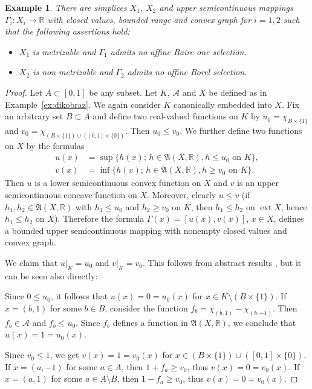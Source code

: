 \documentclass{amsart}
\numberwithin{equation}{section}
\newtheorem{example}[thm]{Example}
\theoremstyle{definition}
\def\fra{\mathfrak{A}}
\def\A{\mathcal A}
\def\er{\mathbb R}
\def\r{|}
\def \ext {\operatorname{ext}}
\newcommand{\setsep}{;\,}
\begin{document}
\begin{example}\label{ex:selekce}
There are simplices $X_1$, $X_2$ and upper semicontinuous mappings $\Gamma_i\colon X_i\to\er$ with closed values, bounded range and convex graph for $i=1,2$ such that the following assertions hold:
\begin{itemize}
	\item[(i)] $X_1$ is metrizable and $\Gamma_1$ admits no affine Baire-one selection.
	\item[(ii)] $X_2$ is non-metrizable and $\Gamma_2$ admits no affine Borel selection.
\end{itemize}
\end{example}

\begin{proof} Let $A\subset [0,1]$ be any subset. Let $K$, $\A$ and $X$ be defined as in Example~\ref{ex:dikobraz}.
We again consider $K$ canonically embedded into $X$. Fix an arbitrary set $B\subset A$ and define two real-valued functions on $K$ by
$u_0=\chi_{B\times\{1\}}$ and $v_0=\chi_{(B\times\{1\})\cup ([0,1]\times\{0\})}$. Then $u_0\le v_0$. We further define two functions on $X$ by the formulas
$$\begin{aligned}
u(x)&=\sup\{ h(x)\setsep h\in\fra(X,\er), h\le u_0\mbox{ on }K\}, \\
v(x)&=\inf\{ h(x)\setsep h\in\fra(X,\er), h\ge v_0\mbox{ on }K\}.
\end{aligned}$$
Then $u$ is a lower semicontinuous convex function on $X$ and $v$ is an upper semicontinuous concave function on $X$. Moreover,
clearly $u\le v$ (if $h_1,h_2\in\fra(X,\er)$ with $h_1\le u_0$ and $h_2\ge v_0$ on $K$, then $h_1\le h_2$ on $\ext X$, hence $h_1\le h_2$ on $X$). Therefore the formula $\Gamma(x)=[u(x),v(x)]$, $x\in X$, defines a bounded upper semicontinuous mapping with nonempty closed values and convex graph.

We claim that $u\r_K=u_0$ and $v\r_K=v_0$. This follows from abstract results \cite[Propositions 3.48 and 3.55]{lmns}, but it can be seen also directly:

Since $0\le u_0$, it follows that $u(x)=0=u_0(x)$ for $x\in K\setminus(B\times \{1\})$. If $x=(b,1)$ for some $b\in B$, consider
the function $f_b=\chi_{(b,1)}-\chi_{(b,-1)}$. Then $f_b\in \A$ and $f_b\le u_0$. Since $f_b$ defines a function in $\fra(X,\er)$, we conclude that $u(x)=1=u_0(x)$.

Since $v_0\le 1$, we get $v(x)=1=v_0(x)$ for $x\in (B\times\{1\})\cup ([0,1]\times\{0\})$. If $x=(a,-1)$ for some $a\in A$, then $1+f_a\ge v_0$, thus
$v(x)=0=v_0(x)$. If $x=(a,1)$ for some $a\in A\setminus B$, then $1-f_a\ge v_0$, thus $v(x)=0=v_0(x)$.


\end{proof}
\end{document}
